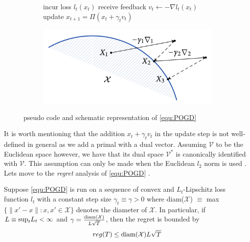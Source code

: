 \begin{figure}[H]
\centering
\begin{subfigure}{.5\textwidth}
    \begin{algorithm}[H]
    \DontPrintSemicolon
     {
    incur loss $l_t(x_t)$ \;
    receive feedback $v_t \gets -\nabla l_t(x_t)$ \;
    update $x_{t+1} = \Pi(x_t + \gamma_t v_t)$ \;
    }
    \end{algorithm}
\end{subfigure}%
\begin{subfigure}{.5\textwidth}
  \centering
  \includegraphics[width=\textwidth]{logos/POGDscheme.png}
\end{subfigure}
\caption{pseudo code and schematic representation of \ref{equ:POGD}}
\label{fig:POGDpseudoCodeAndScheme}
\end{figure}

It is worth mentioning that the addition $x_t + \gamma_t v_t$ in the update step is not well-defined in general as we add a primal with a dual vector. Assuming $\mathcal{V}$ to be the Euclidean space however, we have that its dual space $\mathcal{V}^*$ is canonically identified with $\mathcal{V}$. This assumption can only be made when the Euclidean $l_2$ norm is used \cite{HDRmertikopoulos}. Lets move to the \textit{regret} analysis of \ref{equ:POGD} \cite[Theorem 2.2]{HDRmertikopoulos}.

\begin{proposition}\label{prop:regretPOGD}
    Suppose \ref{equ:POGD} is run on a sequence of convex and $L_t$-Lipschitz loss function $l_t$ with a constant step size $\gamma_t \equiv \gamma > 0$ where  \textnormal{diam}($\mathcal{X}$) $\equiv$ \textnormal{max}$\{\|x'-x\|:x,x' \in \mathcal{X}\}$ denotes the diameter of $\mathcal{X}$. In particular, if $L \equiv \textnormal{sup}_t L_t < \infty$ and $\gamma = \frac{\textnormal{diam}(\mathcal{X})}{L\sqrt{T}}$, then the regret is bounded by 
    \[reg(T) \le \textnormal{diam}(\mathcal{X})L\sqrt{T}\]
\end{proposition}

